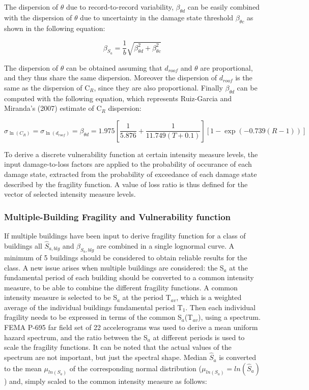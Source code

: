 The dispersion of $\theta$ due to record-to-record variability, $\beta_{\theta d}$ can be easily combined with the dispersion of $\theta$ due to uncertainty in the damage state threshold $\beta_{\theta c}$ as shown in the following equation:

\begin{equation}
\beta_{S_a} = \frac{1}{b} \sqrt{\beta_{\theta d}^2 + \beta_{\theta c}^2}
\label{eq:betaSc_RGM}
\end{equation}

The dispersion of $\theta$ can be obtained assuming that $d_{roof}$ and $\theta$ are proportional, and they thus share the same dispersion. Moreover the dispersion of $d_{roof}$ is the same as the dispersion of C$_R$, since they are also proportional. Finally $\beta_{\theta d}$ can be computed with the following equation, which represents Ruiz-Garcia and Miranda's (2007) estimate of C$_R$ dispersion:

\begin{equation}
\sigma_{\ln(C_R)} = \sigma_{\ln(d_{roof})} = \beta_{\theta d} =  1.975 [\frac{1}{5.876} + \frac{1}{11.749 (T + 0.1)}] [1- \exp(-0.739 (R - 1))]
\label{eq:beta_eq_RGM}
\end{equation}

To derive a discrete vulnerability function at certain intensity measure levels, the input damage-to-loss factors are applied to the probability of occurance of each damage state, extracted from the probability of exceedance of each damage state described by the fragility function. A value of loss ratio is thus defined for the vector of selected intensity measure levels.

\subsubsection{Multiple-Building Fragility and Vulnerability function}
\label{subsubsec:multiple-buildings}
If multiple buildings have been input to derive fragility function for a class of buildings all $\hat{S}_{a, blg}$ and $\beta_{S_a, blg}$ are combined in a single lognormal curve. A minimum of 5 buildings should be considered to obtain reliable results for the class. 
A new issue arises when multiple buildings are considered: the S$_a$ at the fundamental period of each building should be converted to a common intensity measure, to be able to combine the different fragility functions. A common intensity measure is selected to be S$_a$ at the period T$_{av}$, which is a weighted average of the individual buildings fundamental period T$_1$. Then each individual fragility needs to be expressed in terms of the common S$_a$(T$_{av}$), using a spectrum. FEMA P-695 far field set of 22 accelerograms was used to derive a mean uniform hazard spectrum, and the ratio between the S$_a$ at different periods is used to scale the fragility functions. It can be noted that the actual values of the spectrum are not important, but just the spectral shape. 
Median $\hat{S}_a$ is converted to the mean $\mu_{ln(S_a)}$ of the corresponding normal distribution ($\mu_{ln(S_a)} = ln(\hat{S}_a)$) and, simply scaled to the common intensity measure as follows:

